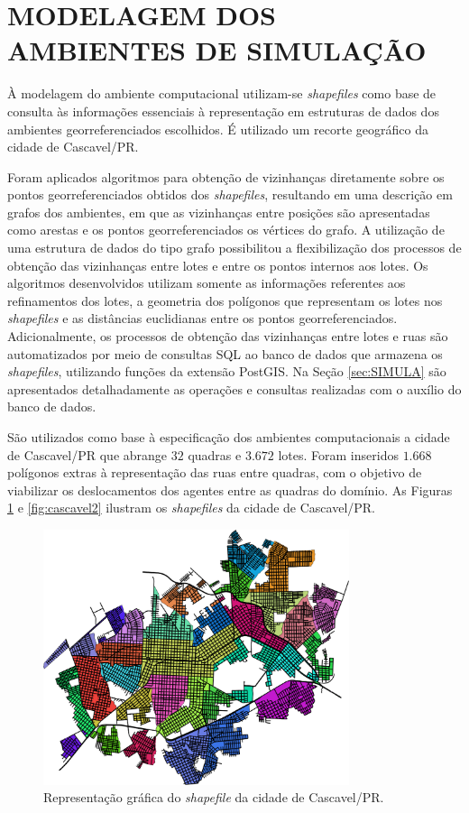\section{MODELAGEM DOS AMBIENTES DE SIMULAÇÃO}
\label{sec:modelagemAmbiente}

À modelagem do ambiente computacional utilizam-se \textit{shapefiles} como base de consulta às informações essenciais à representação em estruturas de dados dos ambientes georreferenciados escolhidos. É utilizado um recorte geográfico da cidade de Cascavel/PR.

Foram aplicados algoritmos para obtenção de vizinhanças diretamente sobre os pontos georreferenciados obtidos dos \textit{shapefiles}, resultando em uma descrição em grafos dos ambientes, em que as vizinhanças entre posições são apresentadas como arestas e os pontos georreferenciados os vértices do grafo. A utilização de uma estrutura de dados do tipo grafo possibilitou a flexibilização dos processos de obtenção das vizinhanças entre lotes e entre os pontos internos aos lotes. Os algoritmos desenvolvidos utilizam somente as informações referentes aos refinamentos dos lotes, a geometria dos polígonos que representam os lotes nos \textit{shapefiles} e as distâncias euclidianas entre os pontos georreferenciados. Adicionalmente, os processos de obtenção das vizinhanças entre lotes e ruas são automatizados por meio de consultas SQL ao banco de dados que armazena os \textit{shapefiles}, utilizando funções da extensão PostGIS. Na Seção \ref{sec:SIMULA} são apresentados detalhadamente as operações e consultas realizadas com o auxílio do banco de dados. 

São utilizados como base à especificação dos ambientes computacionais a cidade de Cascavel/PR que abrange $32$ quadras e $3.672$ lotes. Foram inseridos $1.668$ polígonos extras à representação das ruas entre quadras, com o objetivo de viabilizar os deslocamentos dos agentes entre as quadras do domínio. As Figuras \ref{fig:cascavel1} e \ref{fig:cascavel2} ilustram os \textit{shapefiles} da cidade de Cascavel/PR. 

\begin{figure}[H]
  \centering
  \includegraphics[width=0.8\textwidth]{Figuras/ModelagemAmbiente/Cascavel1.png}
  \caption{Representação gráfica do \textit{shapefile} da cidade de Cascavel/PR.}
  \label{fig:cascavel1}
\end{figure} 

